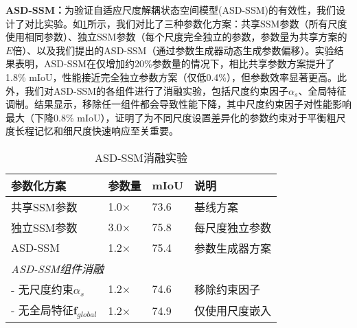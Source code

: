 \documentclass[preprint,12pt]{elsarticle}
\begin{document}
\textbf{ASD-SSM：}为验证自适应尺度解耦状态空间模型(ASD-SSM)的有效性，我们设计了对比实验。如\cref{tab:asdssm}所示，我们对比了三种参数化方案：共享SSM参数（所有尺度使用相同参数）、独立SSM参数（每个尺度完全独立的参数，参数量为共享方案的$E$倍）、以及我们提出的ASD-SSM（通过参数生成器动态生成参数偏移）。实验结果表明，ASD-SSM在仅增加约20\%参数量的情况下，相比共享参数方案提升了1.8\% mIoU，性能接近完全独立参数方案（仅低0.4\%），但参数效率显著更高。此外，我们对ASD-SSM的各组件进行了消融实验，包括尺度约束因子$\alpha_s$、全局特征调制。结果显示，移除任一组件都会导致性能下降，其中尺度约束因子对性能影响最大（下降0.8\% mIoU），证明了为不同尺度设置差异化的参数约束对于平衡粗尺度长程记忆和细尺度快速响应至关重要。
\begin{table}[htbp!]
	\centering
	\caption{ASD-SSM消融实验}
	\label{tab:asdssm}
	\begin{tabular}{@{}llll@{}}
		\toprule
		参数化方案 & 参数量 & mIoU & 说明\\ \midrule
		共享SSM参数 & 1.0$\times$ & 73.6 & 基线方案\\
		独立SSM参数 & 3.0$\times$ & 75.8 & 每尺度独立参数\\
		ASD-SSM & 1.2$\times$ & 75.4 & 参数生成器方案\\
		\midrule
		\multicolumn{4}{l}{\textit{ASD-SSM组件消融}} \\
		\quad - 无尺度约束$\alpha_s$ & 1.2$\times$ & 74.6 & 移除约束因子\\
		\quad - 无全局特征$\mathbf{f}_{global}$ & 1.2$\times$ & 74.9 & 仅使用尺度嵌入\\
		\bottomrule
	\end{tabular}
\end{table}
\end{document}
